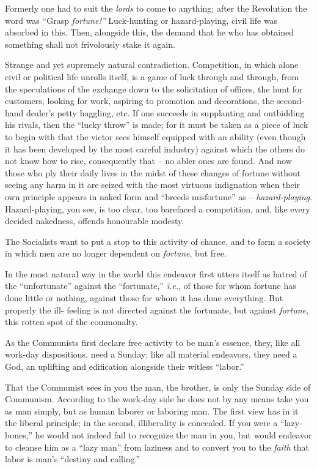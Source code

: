 \documentclass[12pt,a4paper]{book}
\begin{document}
Formerly one had to suit the \textit{lords} to come to anything; after the 
Revolution the word was ``Grasp \textit{fortune!''} Luck-hunting or 
hazard-playing, civil life was absorbed in this. Then, alongside this, the 
demand that he who has obtained something shall not frivolously stake it 
again.

Strange and yet supremely natural contradiction. Competition, in which alone 
civil or political life unrolls itself, is a game of luck through and through, 
from the speculations of the exchange down to the solicitation of offices, the 
hunt for customers, looking for work, aspiring to promotion and decorations, 
the second-hand dealer's petty haggling, etc. If one succeeds in supplanting 
and outbidding his rivals, then the ``lucky throw'' is made; for it must be 
taken as a piece of luck to begin with that the victor sees himself equipped 
with an ability (even though it has been developed by the most careful 
industry) against which the others do not know how to rise, consequently that 
-- no abler ones are found. And now those who ply their daily lives in the 
midst of these changes of fortune without seeing any harm in it are seized 
with the most virtuous indignation when their own principle appears in naked 
form and ``breeds misfortune'' as -- \textit{hazard-playing}. 
Hazard-playing, you see, is too clear, too barefaced a competition, and, like 
every decided nakedness, offends honourable modesty.

The Socialists want to put a stop to this activity of chance, and to form a 
society in which men are no longer dependent on \textit{fortune}, but free.

In the most natural way in the world this endeavor first utters itself as 
hatred of the ``unfortunate'' against the ``fortunate,'' \textit{i.e.}, of 
those for whom fortune has done little or nothing, against those for whom it 
has done everything. But properly the ill- feeling is not directed against the 
fortunate, but against \textit{fortune}, this rotten spot of the commonalty.

As the Communists first declare free activity to be man's essence, they, like 
all work-day dispositions, need a Sunday; like all material endeavors, they 
need a God, an uplifting and edification alongside their witless ``labor.''

That the Communist sees in you the man, the brother, is only the Sunday side 
of Communism. According to the work-day side he does not by any means take you 
as man simply, but as human laborer or laboring man. The first view has in it 
the liberal principle; in the second, illiberality is concealed. If you were a 
``lazy-bones,'' he would not indeed fail to recognize the man in you, but 
would endeavor to cleanse him as a ``lazy man'' from laziness and to convert 
you to the \textit{faith} that labor is man's ``destiny and calling.''
\end{document}
